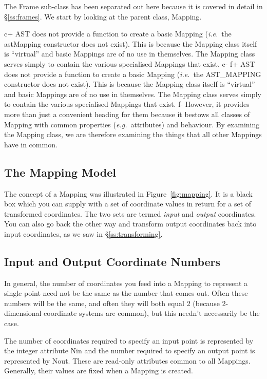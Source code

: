 \documentclass[twoside,11pt]{article}
\newcommand{\secref}[1]{\S\ref{#1}}
\newcommand{\secref}[1]{\ref{#1}}
\begin{document}
The Frame sub-class has been separated out here because it is covered
in detail in \secref{ss:frames}. We start by looking at the parent
class, Mapping.

c+
AST does not provide a function to create a basic Mapping
({\em{i.e.}}\ the astMapping constructor does not exist). This is
because the Mapping class itself is ``virtual'' and basic Mappings are
of no use in themselves. The Mapping class serves simply to contain
the various specialised Mappings that exist.
c-
f+
AST does not provide a function to create a basic Mapping
({\em{i.e.}}\ the AST\_MAPPING constructor does not exist). This is
because the Mapping class itself is ``virtual'' and basic Mappings are
of no use in themselves. The Mapping class serves simply to contain
the various specialised Mappings that exist.
f-
However, it provides more than just a convenient heading for them
because it bestows all classes of Mapping with common properties
({\em{e.g.}}\ attributes) and behaviour.  By examining the Mapping
class, we are therefore examining the things that all other Mappings
have in common.

\subsection{The Mapping Model}

The concept of a Mapping was illustrated in Figure~\ref{fig:mapping}.
It is a black box which you can supply with a set of coordinate values
in return for a set of transformed coordinates. The two sets are
termed {\em{input}} and {\em{output}} coordinates. You can also go
back the other way and transform output coordinates back into input
coordinates, as we saw in \secref{ss:transforming}.

\subsection{Input and Output Coordinate Numbers}

In general, the number of coordinates you feed into a Mapping to
represent a single point need not be the same as the number that comes
out. Often these numbers will be the same, and often they will both
equal 2 (because 2-dimensional coordinate systems are common), but
this needn't necessarily be the case.

The number of coordinates required to specify an input point is
represented by the integer attribute Nin and the number required to
specify an output point is represented by Nout. These are read-only
attributes common to all Mappings. Generally, their values are fixed
when a Mapping is created.
\end{document}

